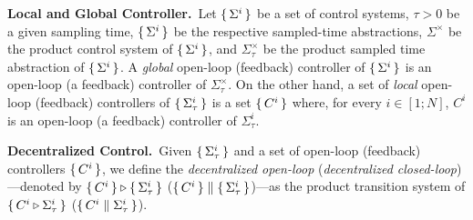 \smallskip
\noindent\textbf{Local and Global Controller.}\
Let $\set{\Sigma^i} $ be a set of control systems, $\tau >0$ be a given sampling time, $\set{\Sigma^i} $ be the respective sampled-time abstractions, $\Sigma^\times$ be the product control system of $\set{\Sigma^i} $, and $\Sigma^\times_\tau$ be the product sampled time abstraction of $\set{\Sigma^i} $.
A \emph{global} open-loop (feedback) controller of $\set{\Sigma^i} $ is an open-loop (a feedback) controller of $\Sigma_\tau^\times$.
On the other hand, a set of \emph{local} open-loop (feedback) controllers of $\set{\Sigma^i_\tau} $ is a set $\set{C^i} $ where, for every $i\in [1;N]$, $C^i$ is an open-loop (a feedback) controller of $\Sigma^i_\tau$.

\smallskip
\noindent\textbf{Decentralized Control.}\
Given $\set{\Sigma_\tau^i} $ and a set of open-loop (feedback) controllers $\set{C^i} $, we define the \emph{decentralized open-loop} (\emph{decentralized closed-loop})---denoted by $\set{C^i} \triangleright \set{\Sigma_\tau^i} $ ($\set{C^i} \parallel \set{\Sigma_\tau^i} $)---as the product transition system of $\set{C^i\triangleright \Sigma^i_\tau} $ ($\set{C^i\parallel \Sigma^i_\tau} $).